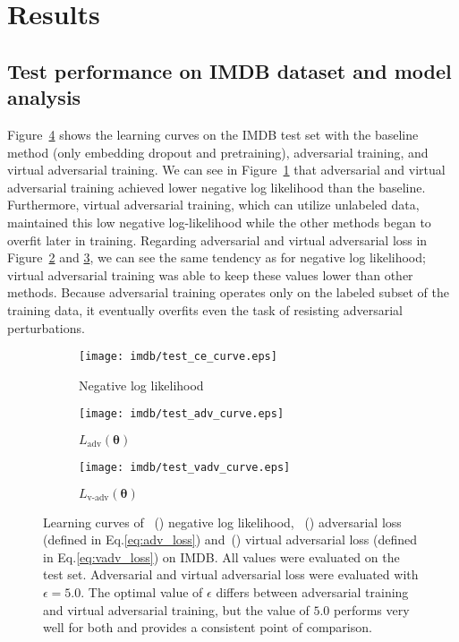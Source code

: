 \documentclass{article}
\newcommand{\vtheta}{\bm{\theta}}
\begin{document}
\section{\label{sec:results}Results}
\subsection{\label{sec:results_imdb}Test performance on IMDB dataset and model analysis}

Figure~\ref{fig:imdb_curves} shows the learning curves on the IMDB test set with the
baseline method (only embedding dropout and pretraining), adversarial training, and virtual adversarial training.
We can see in Figure~\ref{fig:imdb_ce} that adversarial and virtual adversarial
training achieved lower negative log likelihood than the baseline.
Furthermore, virtual adversarial training, which can utilize unlabeled data,
maintained this low negative log-likelihood while the other methods
began to overfit later in training.
Regarding adversarial and virtual adversarial loss in
Figure~\ref{fig:imdb_adv} and \ref{fig:imdb_vadv}, we can see the same tendency as for
negative log likelihood; virtual adversarial training was able to keep these
values lower than other methods.
Because adversarial training operates only on the labeled subset of the training data,
it eventually overfits even the task of resisting adversarial perturbations.

\begin{figure}[ht]
	\begin{subfigure}[h]{0.33\textwidth}
			\texttt{[image: imdb/test\_ce\_curve.eps]}
			\caption{\label{fig:imdb_ce} Negative log likelihood}
	\end{subfigure}
	\begin{subfigure}[h]{0.33\textwidth}
			\texttt{[image: imdb/test\_adv\_curve.eps]}
			\caption{\label{fig:imdb_adv} $L_{\mathrm{adv}}(\vtheta)$}
	\end{subfigure}
	\begin{subfigure}[h]{0.33\textwidth}
			\texttt{[image: imdb/test\_vadv\_curve.eps]}
			\caption{\label{fig:imdb_vadv}  $L_{\mathrm{v\text{-}adv}}(\vtheta)$}
	\end{subfigure}
	\hspace*{\fill}
	\caption{\label{fig:imdb_curves} Learning curves of
	~() negative log likelihood, ~()
	adversarial loss (defined in Eq.\eqref{eq:adv_loss})
	and~() virtual adversarial loss (defined in
	Eq.\eqref{eq:vadv_loss}) on IMDB. All values were evaluated on the test
	set. Adversarial and virtual adversarial loss were evaluated with
	$\epsilon=5.0$.
  The optimal value of $\epsilon$ differs between adversarial training
  and virtual adversarial training, but the value of $5.0$ performs very
  well for both and provides a consistent point of comparison.
  }
\end{figure}
\end{document}
